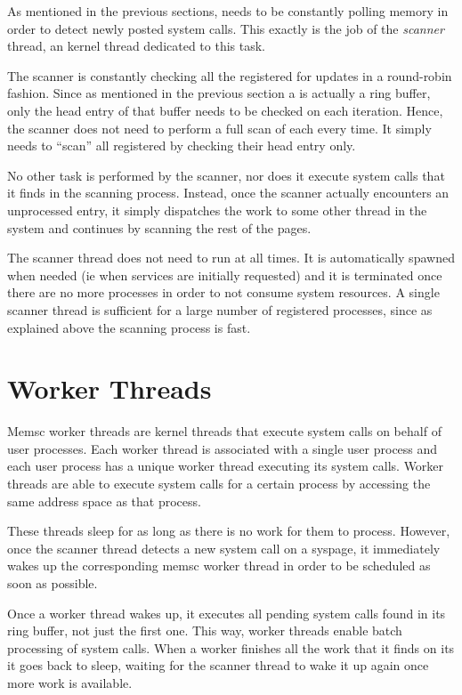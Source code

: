 As mentioned in the previous sections, \llinux needs to be constantly polling
memory in order to detect newly posted system calls. This exactly is the job of
the \emph{scanner} thread, an \llinux kernel thread dedicated to this task.

The scanner is constantly checking all the registered  for updates in a
round-robin fashion. Since as mentioned in the previous section a \sysp is
actually a ring buffer, only the head entry of that buffer needs to be checked
on each iteration. Hence, the scanner does not need to perform a full scan of
each \sysp every time.  It simply needs to ``scan'' all registered  by
checking their head entry only.

No other task is performed by the scanner, nor does it execute system calls
that it finds in the scanning process. Instead, once the scanner actually
encounters an unprocessed entry, it simply dispatches the work to some other
thread in the system and continues by scanning the rest of the pages.

The scanner thread does not need to run at all times. It is automatically
spawned when needed (ie when \memsc services are initially requested) and it is
terminated once there are no more \memsc processes in order to not consume
system resources. A single scanner thread is sufficient for a large number of
registered processes, since as explained above the scanning process is fast.

\section{Worker Threads}
\label{section:workers}

Memsc worker threads are \llinux kernel threads that execute system calls on
behalf of user processes. Each worker thread is associated with a single user
process and each user process has a unique worker thread executing its system
calls. Worker threads are able to execute system calls for a certain process by
accessing the same address space as that process.

These threads sleep for as long as there is no work for them to process.
However, once the scanner thread detects a new system call on a syspage, it
immediately wakes up the corresponding memsc worker thread in order to be
scheduled as soon as possible.

Once a worker thread wakes up, it executes all pending system calls found in
its ring buffer, not just the first one. This way, worker threads enable batch
processing of system calls. When a worker finishes all the work that it finds
on its \sysp it goes back to sleep, waiting for the scanner thread to wake it
up again once more work is available.

